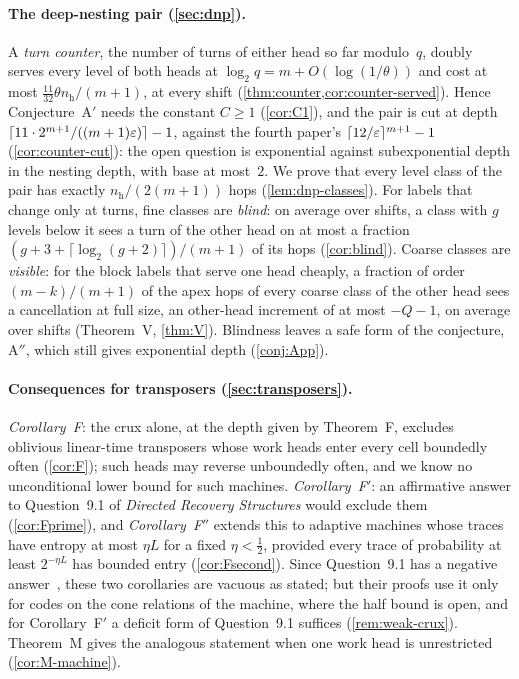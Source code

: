 \paragraph{The deep-nesting pair (\cref{sec:dnp}).} A \emph{turn counter}, the number of turns of either head so far modulo~$q$,
doubly serves every level of both heads at $\log_2q=m+O(\log(1/\theta))$ and cost at most
$\frac{11}{32}\theta n_{\mathrm h}/(m+1)$, at every shift (\cref{thm:counter,cor:counter-served}). Hence Conjecture~A$'$ needs
the constant $C\ge1$ (\cref{cor:C1}), and the pair is cut at depth $\lceil11\cdot2^{m+1}/((m+1)\varepsilon)\rceil-1$, against the fourth
paper's $\lceil12/\varepsilon\rceil^{m+1}-1$ (\cref{cor:counter-cut}): the open question is exponential against subexponential depth in
the nesting depth, with base at most~$2$. We prove that every level class of the pair has exactly $n_{\mathrm h}/(2(m+1))$ hops
(\cref{lem:dnp-classes}). For labels that change only at turns, fine classes are \emph{blind}: on average over shifts, a class with
$g$ levels below it sees a turn of the other head on at most a fraction $(g+3+\lceil\log_2(g+2)\rceil)/(m+1)$ of its hops
(\cref{cor:blind}).
Coarse classes are \emph{visible}: for the block labels that serve one head cheaply, a fraction of order $(m-k)/(m+1)$ of the
apex hops of every coarse class of the other head sees a cancellation at full size, an other-head increment of at most
$-Q-1$, on average over shifts (Theorem~V, \cref{thm:V}). Blindness leaves a safe form of the conjecture, A$''$, which still gives exponential depth (\cref{conj:App}).

\paragraph{Consequences for transposers (\cref{sec:transposers}).} \emph{Corollary~F}: the crux alone, at the depth given by
Theorem~F, excludes oblivious linear-time transposers whose work heads enter every cell boundedly often (\cref{cor:F}); such
heads may reverse unboundedly often, and we know no unconditional lower bound for such machines. \emph{Corollary~F$'$}: an affirmative answer to
Question~9.1 of \emph{Directed Recovery Structures} would exclude them (\cref{cor:Fprime}), and \emph{Corollary~F$''$} extends this to
adaptive machines whose traces have entropy at most $\eta L$ for a fixed $\eta<\frac12$, provided every trace of probability at
least $2^{-\eta L}$ has bounded entry (\cref{cor:Fsecond}). Since Question~9.1 has a negative answer~\cite{StorageCodes2026},
these two corollaries are vacuous as stated; but their proofs use it only for codes on the cone relations of the machine,
where the half bound is open, and for Corollary~F$'$ a deficit form of Question~9.1 suffices (\cref{rem:weak-crux}).
Theorem~M gives the analogous
statement when one work head is unrestricted (\cref{cor:M-machine}).

